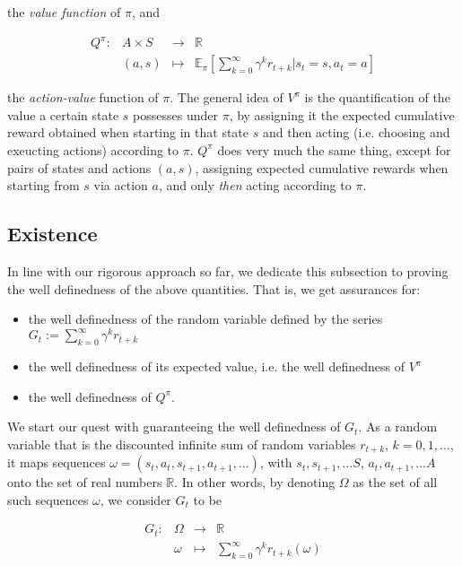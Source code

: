 \documentclass[11pt]{article} %
\begin{document}
the \textit{value function} of $\pi$, and 

\begin{equation}\label{ar_actValFunc}
	\begin{array}{llll}
		Q^{\pi} : 	& A \times S 	& \to 	& \mathbb{R} \\
				& (a,s)		& \mapsto	& \mathbb{E}_{\pi}[\sum_{k=0}^{\infty} \gamma^k r_{t+k} | s_t = s, a_t = a]
	\end{array}
\end{equation}

the \textit{action-value} function of $\pi$. The general idea of $V^{\pi}$ is the quantification of the value a certain state $s$ possesses under $\pi$, by assigning it the expected cumulative reward obtained when starting in that state $s$ and then acting (i.e. choosing and exeucting actions) according to $\pi$. $Q^{\pi}$ does very much the same thing, except for pairs of states and actions $(a,s)$, assigning expected cumulative rewards when starting from $s$ via action $a$, and only \textit{then} acting according to $\pi$.

\subsection{Existence}

In line with our rigorous approach so far, we dedicate this subsection to proving the well definedness of the above quantities. That is, we get assurances for:

\begin{itemize}
	\item the well definedness of the random variable defined by the series $G_t := \sum_{k=0}^{\infty}\gamma^k r_{t+k}$
	\item the well definedness of its expected value, i.e. the well definedness of $V^{\pi}$
	\item the well definedness of $Q^{\pi}$.
\end{itemize}

We start our quest with guaranteeing the well definedness of $G_t$. As a random variable that is the discounted infinite sum of random variables $r_{t+k}$, $k=0,1,\dots$, it maps sequences $\omega = (s_t, a_t, s_{t+1}, a_{t+1}, \dots ) $, with $s_t,s_{t+1},\dots S$, $a_t, a_{t+1},\dots A$ onto the set of real numbers $\mathbb{R}$. In other words, by denoting $\Omega$ as the set of all such sequences $\omega$, we consider $G_t$ to be

\begin{equation}
	\begin{array}{rlll}\label{ar_cumRew}
		G_t: 	& \Omega 		& \rightarrow 	& \mathbb{R} \\
			&	\omega	& \mapsto 	& \sum_{k=0}^{\infty} \gamma^k r_{t+k}(\omega)
	\end{array}
\end{equation}
\end{document}
